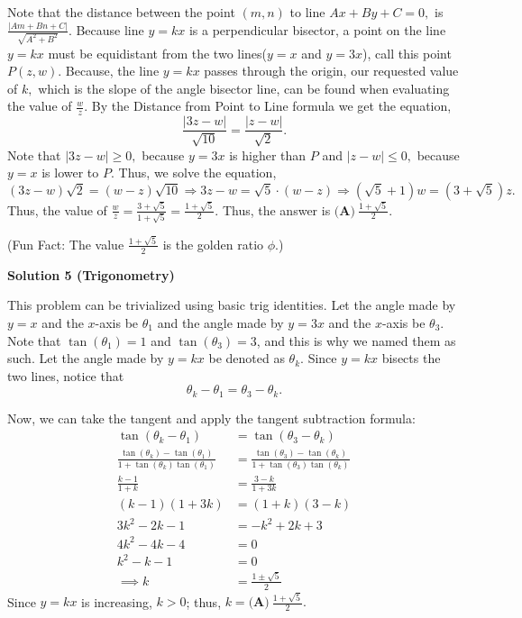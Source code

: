\begin{enumerate}
Note that the distance between the point $(m,n)$ to line $Ax + By + C = 0,$ is $\frac{|Am + Bn +C|}{\sqrt{A^2 +B^2}}.$ Because line $y=kx$ is a perpendicular bisector, a point on the line $y=kx$ must be equidistant from the two lines($y=x$ and $y=3x$), call this point $P(z,w).$ Because, the line $y=kx$ passes through the origin, our requested value of $k,$ which is the slope of the angle bisector line, can be found when evaluating the value of $\frac{w}{z}.$ By the Distance from Point to Line formula we get the equation, 
 \[\frac{|3z-w|}{\sqrt{10}} = \frac{|z-w|}{\sqrt{2}}.\] Note that $|3z-w|\ge 0,$ because $y=3x$ is higher than $P$ and $|z-w|\le 0,$ because $y=x$ is lower to $P.$ Thus, we solve the equation, 
 \[(3z-w)\sqrt{2} = (w-z)\sqrt{10} \Rightarrow  3z-w = \sqrt{5} \cdot(w-z)\Rightarrow (\sqrt{5} +1)w = (3+\sqrt{5})z.\] Thus, the value of $\frac{w}{z} = \frac{3+\sqrt{5}}{1+\sqrt{5}} = \frac{1+\sqrt{5}}{2}.$ Thus, the answer is $\boxed{\textbf{(A)} \ \frac{1+\sqrt{5}}{2}}.$

 (Fun Fact: The value $\frac{1+\sqrt{5}}{2}$ is the golden ratio $\phi.$)

 



\textbf{Solution 5 (Trigonometry)}

This problem can be trivialized using basic trig identities. Let the angle made by $y=x$ and the $x$-axis be $\theta_{1}$ and the angle made by $y=3x$ and the $x$-axis be $\theta_{3}$. Note that $\tan(\theta_{1})=1$ and $\tan(\theta_{3})=3$, and this is why we named them as such. Let the angle made by $y=kx$ be denoted as $\theta_{k}$. Since $y=kx$ bisects the two lines, notice that
 \[\theta_k-\theta_1=\theta_3-\theta_k.\]

 Now, we can take the tangent and apply the tangent subtraction formula:
 \begin{align*} \tan(\theta_k-\theta_1)&=\tan(\theta_3-\theta_k)\\ \frac{\tan(\theta_k)-\tan(\theta_1)}{1+\tan(\theta_k)\tan(\theta_1)}&=\frac{\tan(\theta_3)-\tan(\theta_k)}{1+\tan(\theta_3)\tan(\theta_k)}\\ \frac{k-1}{1+k}&=\frac{3-k}{1+3k}\\ (k-1)(1+3k)&=(1+k)(3-k)\\ 3k^2-2k-1&=-k^2+2k+3\\ 4k^2-4k-4&=0\\ k^2-k-1&=0\\ \implies k&=\frac{1\pm \sqrt{5}}{2} \end{align*}
Since $y=kx$ is increasing, $k>0$; thus, $k=\boxed{\textbf{(A)} \ \frac{1+\sqrt{5}}{2}}.$





\end{enumerate}
